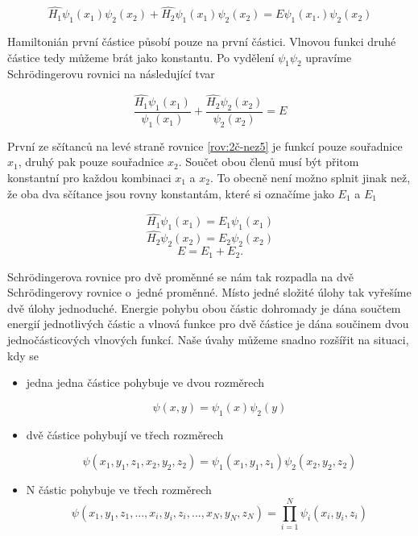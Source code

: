 \begin{equation}
\hat{H_{1}}\psi_{1}(x_{1})\psi_{2}(x_{2})+\hat{H_{2}}\psi_{1}(x_{1})\psi_{2}(x_{2})=E\psi_{1}(x_{1}.)\psi_{2}(x_{2})
\label{rov:2č-nez44}
\end{equation}


Hamiltonián první částice působí pouze na první částici. Vlnovou funkci druhé částice tedy můžeme brát jako konstantu. Po vydělení $\psi_{1}\psi_{2}$ upravíme Schr\"odingerovu rovnici na následující tvar 

\begin{equation}
\frac{\hat{H_{1}}\psi_{1}(x_{1})}{\psi_{1}(x_{1})}+\frac{\hat{H_{2}}\psi_{2}(x_{2})}{\psi_{2}(x_{2})}=E
\label{rov:2č-nez5}
\end{equation}

První ze sčítanců na levé straně rovnice \eqref{rov:2č-nez5} je funkcí pouze souřadnice $x_{1}$, druhý pak pouze souřadnice $x_{2}$. Součet obou členů musí být přitom konstantní pro každou kombinaci  $x_{1}$ a $x_{2}$. To obecně není možno splnit jinak než, že oba dva sčítance jsou rovny konstantám, které si označíme jako $E_{1}$ a $E_{1}$

\begin{equation}
\hat{H_{1}}\psi_{1}(x_{1})=E_{1}\psi_{1}(x_{1})
\label{rov:2č-nez6}
\end{equation}
\begin{equation}
\hat{H_{2}}\psi_{2}(x_{2})=E_{2}\psi_{2}(x_{2})
\label{rov:2č-nez7}
\end{equation}
\begin{equation}
E=E_{1}+E_{2}.
\label{rov:2č-nez8}
\end{equation}

Schr\"odingerova rovnice pro dvě proměnné se nám tak rozpadla na dvě Schr\"odingerovy rovnice o~jedné proměnné. Místo jedné složité úlohy tak vyřešíme dvě úlohy jednoduché. Energie pohybu obou částic dohromady je dána součtem energií jednotlivých částic a vlnová funkce pro dvě částice je dána součinem dvou jednočásticových vlnových funkcí. Naše úvahy můžeme snadno rozšířit na situaci, kdy se
\begin{itemize}
\item jedna jedna částice pohybuje ve dvou rozměrech

\begin{equation}
\psi(x,y)=\psi_{1}(x)\psi_{2}(y)
\label{rov:2č-nez9}
\end{equation}

\item dvě částice pohybují ve třech rozměrech

\begin{equation}
\psi(x_{1},y_{1},z_{1},x_{2},y_{2},z_{2})=\psi_{1}(x_{1},y_{1},z_{1})\psi_{2}(x_{2},y_{2},z_{2})
\label{rov:2č-nez4}
\end{equation}

\item N částic pohybuje ve třech rozměrech
\begin{equation}
\psi(x_{1},y_{1},z_{1},...,x_{i},y_{i},z_{i},...,x_{N},y_{N},z_{N})=
\prod_{i=1}^N\psi_{i}(x_{i},y_{i},z_{i})
\label{rov:2č-Nčástic}
\end{equation}

\end{itemize}


